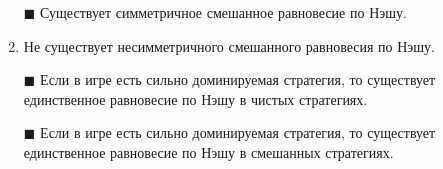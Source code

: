 \begin{enumerate}[label=$\square$]
	
	
	
	
	
	\item[$\blacksquare$] Существует симметричное смешанное равновесие по Нэшу.
	\item Не существует несимметричного смешанного равновесия по Нэшу.	
	\item[$\blacksquare$] Если в игре есть сильно доминируемая стратегия, то существует единственное равновесие по Нэшу в чистых стратегиях.
	\item[$\blacksquare$] Если в игре есть сильно доминируемая стратегия, то существует единственное равновесие по Нэшу в смешанных стратегиях.
\end{enumerate}

